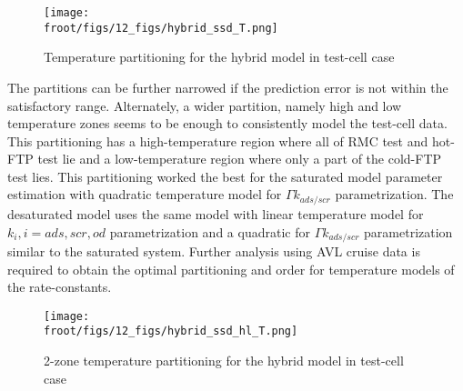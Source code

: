 \begin{figure}[H]
        \centering
        \texttt{[image: \\froot/figs/12\_figs/hybrid\_ssd\_T.png]}
        \caption{Temperature partitioning for the hybrid model in test-cell case}
\end{figure}

The partitions can be further narrowed if the prediction error is not within the satisfactory range. Alternately, a wider partition, namely high and low temperature zones seems to be enough to consistently model the test-cell data. This partitioning has a high-temperature region where all of RMC test and hot-FTP test lie and a low-temperature region where only a part of the cold-FTP test lies. This partitioning worked the best for the saturated model parameter estimation with quadratic temperature model for $\Gamma k_{ads/scr}$ parametrization. The desaturated model uses the same model with linear temperature model for $k_i, i=ads, scr, od$ parametrization and a quadratic for $\Gamma k_{ads/scr}$ parametrization similar to the saturated system. Further analysis using AVL cruise data is required to obtain the optimal partitioning and order for temperature models of the rate-constants.

\begin{figure}[H]
        \centering
        \texttt{[image: \\froot/figs/12\_figs/hybrid\_ssd\_hl\_T.png]}
        \caption{2-zone temperature partitioning for the hybrid model in test-cell case}
\end{figure}
